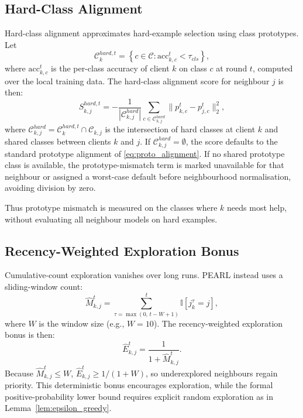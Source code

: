 \documentclass[conference]{IEEEtran}
\newcommand{\rev}[1]{#1}
\begin{document}
\subsection{Hard-Class Alignment}
\label{subsec:hard-class-alignment}
Hard-class alignment approximates hard-example selection using class prototypes. Let
\begin{equation*}
    \mathcal{C}_k^{hard,t}
    =
    \left\{
    c \in \mathcal{C} :
    \mathrm{acc}_{k,c}^t < \tau_{cls}
    \right\},
\end{equation*}
where \(\mathrm{acc}_{k,c}^t\) is the per-class accuracy of client \(k\) on class \(c\) at round \(t\), computed over the local training data. The hard-class alignment score for neighbour \(j\) is then:
\begin{equation}
    S_{k,j}^{hard,t}
    =
    -\frac{1}{|\mathcal{C}_{k,j}^{hard}|}
    \sum_{c \in \mathcal{C}_{k,j}^{hard}}
    \|p_{k,c}^t - p_{j,c}^t\|_2^2,
    \label{eq:hard_class_alignment}
\end{equation}
where \(\mathcal{C}_{k,j}^{hard} = \mathcal{C}_k^{hard,t} \cap \mathcal{C}_{k,j}\) is the intersection of hard classes at client \(k\) and shared classes between clients \(k\) and \(j\). If \(\mathcal{C}_{k,j}^{hard} = \emptyset\), the score defaults to the standard prototype alignment of \eqref{eq:proto_alignment}. \rev{If no shared prototype class is available, the prototype-mismatch term is marked unavailable for that neighbour or assigned a worst-case default before neighbourhood normalisation, avoiding division by zero.}

Thus prototype mismatch is measured on the classes where \(k\) needs most help, without evaluating all neighbour models on hard examples.

\subsection{Recency-Weighted Exploration Bonus}
\label{subsec:recency-weighted-exploration}
Cumulative-count exploration vanishes over long runs. PEARL instead uses a sliding-window count:
\begin{equation}
    \hat{M}_{k,j}^t
    =
    \sum_{\tau = \max(0,\, t-W+1)}^{t}
    \mathbb{I}\left[j_k^\tau = j\right],
    \label{eq:recency_count}
\end{equation}
where \(W\) is the window size (e.g., \(W = 10\)). The recency-weighted exploration bonus is then:
\begin{equation}
    \hat{E}_{k,j}^t
    =
    \frac{1}{1 + \hat{M}_{k,j}^t}.
    \label{eq:recency_exploration}
\end{equation}
Because \(\hat{M}_{k,j}^t\le W\), \(\hat{E}_{k,j}^t\ge1/(1+W)\), so underexplored neighbours regain priority. \rev{This deterministic bonus encourages exploration, while the formal positive-probability lower bound requires explicit random exploration as in Lemma~\ref{lem:epsilon_greedy}.}
\end{document}
